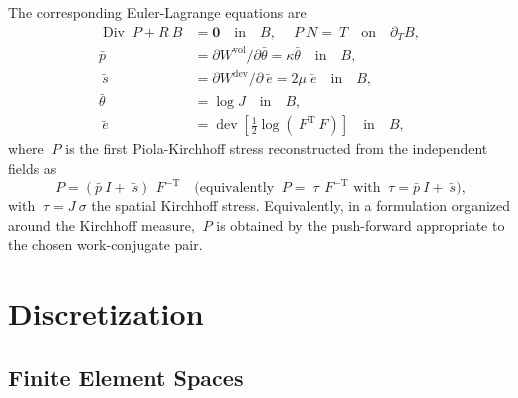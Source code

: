 \documentclass[12pt]{article}
\newcommand{\F}{~F}
\renewcommand{\P}{~P}
\newcommand{\ebar}{\bar{~e}}
\newcommand{\btau}{~\tau}
\newcommand{\sbar}{\bar{~s}}
\newcommand{\thbar}{\bar{\theta}}
\newcommand{\pbar}{\bar{p}}
\newcommand{\supvol}{^{\mathrm{vol}}}
\newcommand{\supdev}{^{\mathrm{dev}}}
\DeclareMathOperator{\dev}{dev}
\DeclareMathOperator{\Div}{Div}
\newcommand{\transpose}[1]{{#1}^{\mathrm{T}}}
\begin{document}
The corresponding Euler-Lagrange equations are
\begin{equation}
  \label{eq:euler-lagrange}
  \begin{split}
    \Div \P + R ~B & = \mathbf{0} \quad \text{in} \quad B,
    \quad
    \P ~N = ~T \quad \text{on} \quad \partial_T B,
    \\
    \pbar & = \partial W\supvol / \partial \thbar = \kappa \thbar \quad \text{in} \quad B,
    \\
    \sbar & = \partial W\supdev / \partial \ebar = 2\mu \ebar \quad \text{in} \quad B,
    \\
    \thbar & = \log J \quad \text{in} \quad B,
    \\
    \ebar & = \dev \left[ \tfrac{1}{2} \log (\transpose{\F}\F) \right] \quad \text{in} \quad B,
  \end{split}
\end{equation}
where $\P$ is the first Piola-Kirchhoff stress reconstructed from
the independent fields as
\begin{equation}
  \label{eq:P-reconstruction}
  \P = (\pbar ~I + \sbar) \, \F^{-\mathrm{T}}
  \quad\text{(equivalently } \P = \btau \, \F^{-\mathrm{T}} \text{ with } \btau = \pbar ~I + \sbar \text{)},
\end{equation}
with $\btau = J ~\sigma$ the spatial Kirchhoff stress. Equivalently, in
a formulation organized around the Kirchhoff measure, $\P$
is obtained by the push-forward appropriate to the chosen
work-conjugate pair.


\section{Discretization}
\label{sec:discretization}

\subsection{Finite Element Spaces}
\label{sec:fe-spaces}
\end{document}
